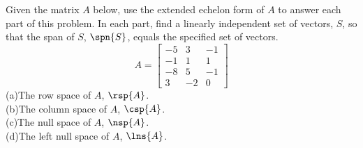 Given the matrix $A$ below, use the extended echelon form of $A$ to answer each part of this problem.  In each part, find a linearly independent set of vectors, $S$, so that the span of $S$, $\spn{S}$, equals the specified set of vectors.
%
\begin{equation*}
A=
\begin{bmatrix}
 -5 & 3 & -1 \\
 -1 & 1 & 1 \\
 -8 & 5 & -1 \\
 3 & -2 & 0
\end{bmatrix}
\end{equation*}
%
(a)\quad  The row space of $A$, $\rsp{A}$.\\
(b)\quad The column space of $A$, $\csp{A}$.\\
(c)\quad The null space of $A$, $\nsp{A}$.\\
(d)\quad The left null space of $A$, $\lns{A}$.\\

